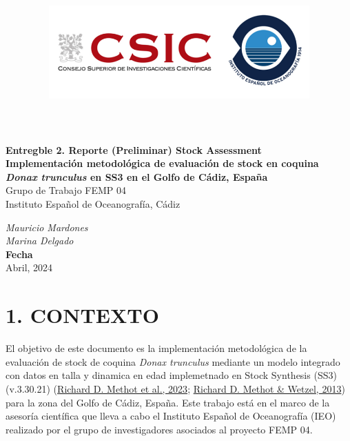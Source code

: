 \documentclass[
]{article}
\title{\includegraphics[width=10cm,height=\textheight]{IEO-logo2.png}}
\author{}
\date{\vspace{-2.5em}}
\begin{document}
\maketitle



\begin{flushleft}
\Large{\textbf{Entregble 2. Reporte (Preliminar) Stock Assessment}}\\
\vspace*{2\baselineskip}
\LARGE{\textbf{Implementación metodológica de evaluación de stock en coquina \textit{Donax trunculus} en SS3 en el Golfo de Cádiz, España}}\\
\vspace*{5\baselineskip}
\Large{Grupo de Trabajo FEMP 04}\\
\vspace*{1\baselineskip}
\Large{Instituto Español de Oceanografía, Cádiz }\\
\vspace*{4\baselineskip}
\end{flushleft}
\begin{flushright}
\large{\textit{Mauricio Mardones}}\\
\large{\textit{Marina Delgado}}\\
\vspace*{1\baselineskip}
\normalsize{\textbf{Fecha}}\\
Abril, 2024
\end{flushright}



\hypersetup{linkcolor = black}
\newpage
{}

\newpage



\hypersetup{linkcolor = blue}

{
\hypersetup{linkcolor=}
\setcounter{tocdepth}{3}
\tableofcontents
}
\pagebreak

\hypertarget{contexto}{%
\section{1. CONTEXTO}\label{contexto}}

El objetivo de este documento es la implementación metodológica de la evaluación de stock de coquina \emph{Donax trunculus} mediante un modelo integrado con datos en talla y dinamica en edad implemetnado en Stock Synthesis (SS3) (v.3.30.21) (\protect\hyperlink{ref-Methot2023}{Richard D. Methot et al., 2023}; \protect\hyperlink{ref-Methot2013}{Richard D. Methot \& Wetzel, 2013}) para la zona del Golfo de Cádiz, España. Este trabajo está en el marco de la asesoría científica que lleva a cabo el Instituto Español de Oceanografía (IEO) realizado por el grupo de investigadores asociados al proyecto FEMP 04.
\end{document}
